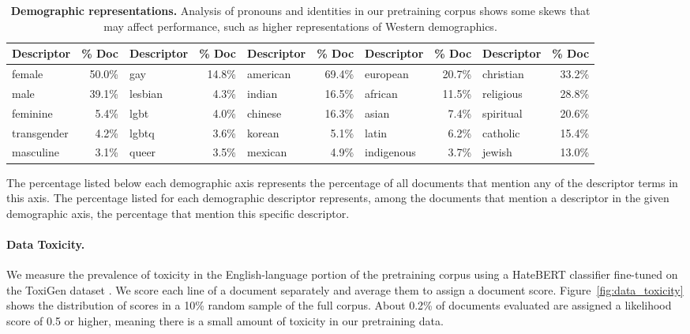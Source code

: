 \begin{table}[htbp]
\begin{subtable}{\textwidth}
\begin{small}
\begin{tabular}{lrlrlrlrlr}
        \textbf{Descriptor} & \multicolumn{1}{l}{\textbf{\% Doc}} & \textbf{Descriptor} & \multicolumn{1}{l}{\textbf{\% Doc}} & \textbf{Descriptor} & \multicolumn{1}{l}{\textbf{\% Doc}} & \textbf{Descriptor} & \multicolumn{1}{l}{\textbf{\% Doc}} & \textbf{Descriptor} & \multicolumn{1}{l}{\textbf{\% Doc}} \\
        \midrule
        female & 50.0\% & gay & 14.8\% & american & 69.4\% & european & 20.7\% & christian & 33.2\% \\
        male & 39.1\% & lesbian & 4.3\% & indian & 16.5\% & african & 11.5\% & religious & 28.8\% \\
        feminine & 5.4\% & lgbt & 4.0\% & chinese & 16.3\% & asian & 7.4\% & spiritual & 20.6\% \\
        transgender & 4.2\% & lgbtq & 3.6\% & korean & 5.1\% & latin & 6.2\% & catholic & 15.4\% \\
        masculine & 3.1\% & queer & 3.5\% & mexican & 4.9\% & indigenous & 3.7\% & jewish & 13.0\% \\
        \bottomrule
        \end{tabular}
        \end{small}
        \caption{The percentage listed below each demographic axis represents the percentage of all documents that mention any of the descriptor terms in this axis. The percentage listed for each demographic descriptor represents, among the documents that mention a descriptor in the given demographic axis, the percentage that mention this specific descriptor. }
        \label{tab:holisticbias_freqs}
    \end{subtable}
    \caption{\textbf{Demographic representations.} Analysis of pronouns and identities in our pretraining corpus shows some skews that may affect performance, such as higher representations of Western demographics.}
    \label{tab:demographic_representations}
\end{table}

\paragraph{Data Toxicity.} We measure the prevalence of toxicity in the English-language portion of the pretraining corpus using a HateBERT classifier fine-tuned on the ToxiGen dataset \citep{hartvigsen2022toxigen}. We score each line of a document separately and average them to assign a document score. Figure~\ref{fig:data_toxicity} shows the distribution of scores in a 10\% random sample of the full corpus. About 0.2\% of documents evaluated are assigned a likelihood score of 0.5 or higher, meaning there is a small amount of toxicity in our pretraining data. 

